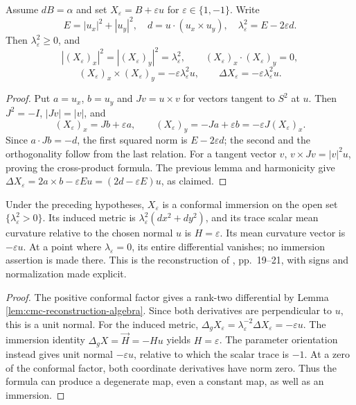 \begin{lemma}\label{lem:cmc-reconstruction-algebra}
Assume $dB=\alpha$ and set $X_\varepsilon=B+\varepsilon u$ for $\varepsilon\in\{1,-1\}$. Write
\[
 E=|u_x|^2+|u_y|^2,\quad d=u\cdot(u_x\times u_y),\quad
 \lambda_\varepsilon^2=E-2\varepsilon d.
\]
Then $\lambda_\varepsilon^2\ge0$, and
\[
 |(X_\varepsilon)_x|^2=|(X_\varepsilon)_y|^2=\lambda_\varepsilon^2,\qquad
 (X_\varepsilon)_x\cdot(X_\varepsilon)_y=0,
\]
\[
 (X_\varepsilon)_x\times(X_\varepsilon)_y=-\varepsilon\lambda_\varepsilon^2u,
 \qquad \Delta X_\varepsilon=-\varepsilon\lambda_\varepsilon^2u.
\]
\end{lemma}
\begin{proof}
Put $a=u_x$, $b=u_y$ and $Jv=u\times v$ for vectors tangent to $S^2$ at $u$. Then $J^2=-I$, $|Jv|=|v|$, and
\[
 (X_\varepsilon)_x=Jb+\varepsilon a,\qquad
 (X_\varepsilon)_y=-Ja+\varepsilon b=-\varepsilon J(X_\varepsilon)_x.
\]
Since $a\cdot Jb=-d$, the first squared norm is $E-2\varepsilon d$; the second and the orthogonality follow from the last relation. For a tangent vector $v$, $v\times Jv=|v|^2u$, proving the cross-product formula. The previous lemma and harmonicity give $\Delta X_\varepsilon=2a\times b-\varepsilon Eu=(2d-\varepsilon E)u$, as claimed.
\end{proof}

\begin{theorem}\label{thm:cmc-harmonic-reconstruction}
Under the preceding hypotheses, $X_\varepsilon$ is a conformal immersion on the open set $\{\lambda_\varepsilon^2>0\}$. Its induced metric is $\lambda_\varepsilon^2(dx^2+dy^2)$, and its trace scalar mean curvature relative to the chosen normal $u$ is $H=\varepsilon$. Its mean curvature vector is $-\varepsilon u$. At a point where $\lambda_\varepsilon=0$, its entire differential vanishes; no immersion assertion is made there. This is the reconstruction of \cite{Hel01}, pp.~19--21, with signs and normalization made explicit.
\end{theorem}
\begin{proof}
The positive conformal factor gives a rank-two differential by Lemma \ref{lem:cmc-reconstruction-algebra}. Since both derivatives are perpendicular to $u$, this is a unit normal. For the induced metric, $\Delta_g X_\varepsilon=\lambda_\varepsilon^{-2}\Delta X_\varepsilon=-\varepsilon u$. The immersion identity $\Delta_gX=\vec H=-Hu$ yields $H=\varepsilon$. The parameter orientation instead gives unit normal $-\varepsilon u$, relative to which the scalar trace is $-1$. At a zero of the conformal factor, both coordinate derivatives have norm zero. Thus the formula can produce a degenerate map, even a constant map, as well as an immersion.
\end{proof}

